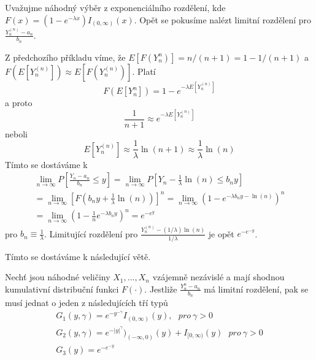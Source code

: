 \begin{example}
Uvažujme náhodný výběr z exponenciálního rozdělení, kde $F(x) = (1 - e^{-\lambda x})I_{(0, \infty)}(x)$. Opět se pokusíme nalézt limitní rozdělení pro $\frac{Y_n^{(n)} - a_n}{b_n}$.

Z předchozího příkladu víme, že $E[F(Y_n^{n})] = n / (n + 1) = 1 - 1 / (n + 1)$ a $F(E[Y_n^{(n)}]) \approx E[F(Y_n^{(n)})]$. Platí
\begin{equation*}
F(E[Y_n^{n}]) = 1 - e^{-\lambda E[Y_n^{(n)}]}
\end{equation*}
a proto
\begin{equation*}
\frac{1}{n + 1} \approx e^{-\lambda E[Y_n^{(n)}]}
\end{equation*}
neboli
\begin{equation*}
E[Y_n^{(n)}] \approx \frac{1}{\lambda}\ln(n+1) \approx \frac{1}{\lambda} \ln(n)
\end{equation*}
Tímto se dostáváme k
\begin{gather*}
\lim_{n \rightarrow \infty} P \left[\frac{Y_n - a_n}{b_n} \le y \right] = \lim_{n \rightarrow \infty} P \left[Y_n - \frac{1}{\lambda}\ln(n) \le b_n y\right]\\
= \lim_{n \rightarrow \infty} \left[F \left(b_n y + \frac{1}{\lambda} \ln(n) \right) \right]^n = \lim_{n \rightarrow \infty} \left(1 - e^{-\lambda b_n y - \ln(n)} \right)^n\\
= \lim_{n \rightarrow \infty} \left(1 - \frac{1}{n}e^{-\lambda b_n y} \right)^n = e^{-e^{y}}
\end{gather*}
pro $b_n \equiv \frac{1}{\lambda}$. Limitující rozdělení pro $\frac{Y_n^{(n)} - (1/\lambda)\ln(n)}{1 / \lambda}$ je opět $e^{-e^{-y}}$.
\end{example}

Tímto se dostáváme k následující větě.
\begin{theorem}
Nechť jsou náhodné veličiny $X_1, ..., X_n$ vzájemně nezávislé a mají shodnou kumulativní distribuční funkci $F(\cdot)$. Jestliže $\frac{Y_n^{n} - a_n}{b_n}$ má limitní rozdělení, pak se musí jednat o jeden z následujících tří typů
\begin{gather*}
G_1(y, \gamma) = e^{-y^{-\gamma}}I_{(0, \infty)}(y), ~~~ \textit{pro} ~ \gamma > 0\\
G_2(y, \gamma) = e^{-|y|^\gamma})_{(-\infty, 0)}(y) + I_{[0, \infty)}(y)  ~~~ \textit{pro} ~ \gamma > 0\\
G_3(y) = e^{-e^{-y}}
\end{gather*}
\end{theorem}

